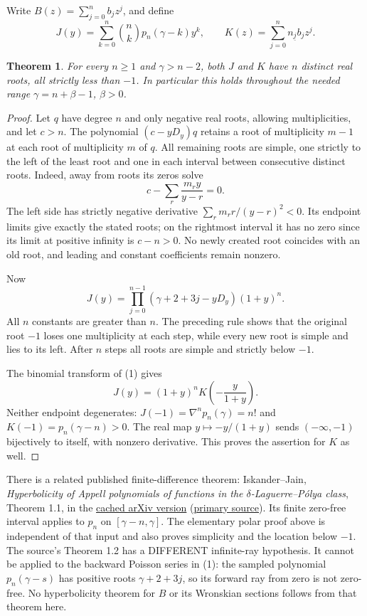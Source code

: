 \documentclass[11pt]{article}
\newtheorem{theorem}{Theorem}
\begin{document}
Write $B(z)=\sum_{j=0}^n b_jz^j$, and define
\[
 J(y)=\sum_{k=0}^n\binom nk p_n(\gamma-k)y^k,
 \qquad K(z)=\sum_{j=0}^n n_{\underline j}b_jz^j.              \tag{2}
\]
\begin{theorem}\label{thm:polar}
For every $n\ge1$ and $\gamma>n-2$, both $J$ and $K$ have $n$
distinct real roots, all strictly less than $-1$.
In particular this holds throughout the needed range
$\gamma=n+\beta-1$, $\beta>0$.
\end{theorem}
\begin{proof}
Let $q$ have degree $n$ and only negative real roots, allowing
multiplicities, and let $c>n$. The polynomial $(c-yD_y)q$ retains a
root of multiplicity $m-1$ at each root of multiplicity $m$ of $q$.
All remaining roots are simple, one strictly to the left of the least
root and one in each interval between consecutive distinct roots.
Indeed, away from roots its zeros solve
\[
 c-\sum_r\frac{m_r y}{y-r}=0.
\]
The left side has strictly negative derivative
$\sum_r m_r r/(y-r)^2<0$. Its endpoint limits give exactly the stated
roots; on the rightmost interval it has no zero since its limit at
positive infinity is $c-n>0$. No newly created root coincides with an
old root, and leading and constant coefficients remain nonzero.

Now
\[
 J(y)=\prod_{j=0}^{n-1}(\gamma+2+3j-yD_y)(1+y)^n.
\]
All $n$ constants are greater than $n$. The preceding rule shows that
the original root $-1$ loses one multiplicity at each step, while every
new root is simple and lies to its left. After $n$ steps all roots are
simple and strictly below $-1$.

The binomial transform of (1) gives
\[
 J(y)=(1+y)^nK\left(-\frac{y}{1+y}\right).                   \tag{3}
\]
Neither endpoint degenerates: $J(-1)=\nabla^np_n(\gamma)=n!$
and $K(-1)=p_n(\gamma-n)>0$. The real map
$y\mapsto-y/(1+y)$ sends $(-\infty,-1)$ bijectively to itself,
with nonzero derivative. This proves the assertion for $K$ as well.
\end{proof}

There is a related published finite-difference theorem: Iskander--Jain,
\emph{Hyperbolicity of Appell polynomials of functions in the
$\delta$-Laguerre--P\'olya class}, Theorem 1.1, in the
\href{https://arxiv.org/pdf/2002.09906}{cached arXiv version}
(\href{https://arxiv.org/abs/2002.09906}{primary source}).
Its finite zero-free interval applies to $p_n$ on $[\gamma-n,\gamma]$.
The elementary polar proof above is independent of that input and also
proves simplicity and the location below $-1$.
The source's Theorem 1.2 has a DIFFERENT infinite-ray hypothesis.
It cannot be applied to the backward Poisson series in (1): the sampled
polynomial $p_n(\gamma-s)$ has positive roots $\gamma+2+3j$, so its
forward ray from zero is not zero-free. No hyperbolicity theorem for $B$
or its Wronskian sections follows from that theorem here.
\end{document}
